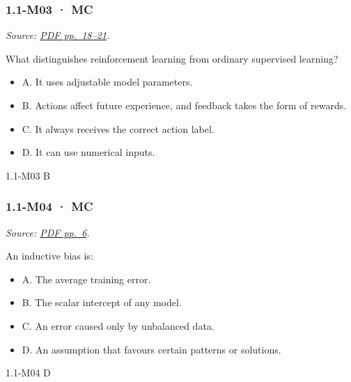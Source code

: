 \noindent\begin{minipage}{\linewidth}

\subsubsection{1.1-M03 · MC}\label{m03-mc}

\emph{Source:
\href{../Lecture\%20Slides/1.1.\%20Fundamentals.pdf\#page=18}{PDF
pp.~18--21}.}

What distinguishes reinforcement learning from ordinary supervised
learning?

\begin{itemize}
\tightlist
\item
  A. It uses adjustable model parameters.
\item
  B. Actions affect future experience, and feedback takes the form of
  rewards.
\item
  C. It always receives the correct action label.
\item
  D. It can use numerical inputs.
\end{itemize}

\begin{solution}[8mm]{1.1-M03}
B
\end{solution}
\end{minipage}\par\medskip

\noindent\begin{minipage}{\linewidth}

\subsubsection{1.1-M04 · MC}\label{m04-mc}

\emph{Source:
\href{../Lecture\%20Slides/1.1.\%20Fundamentals.pdf\#page=6}{PDF
pp.~6}.}

An inductive bias is:

\begin{itemize}
\tightlist
\item
  A. The average training error.
\item
  B. The scalar intercept of any model.
\item
  C. An error caused only by unbalanced data.
\item
  D. An assumption that favours certain patterns or solutions.
\end{itemize}

\begin{solution}[8mm]{1.1-M04}
D
\end{solution}
\end{minipage}\par\medskip

